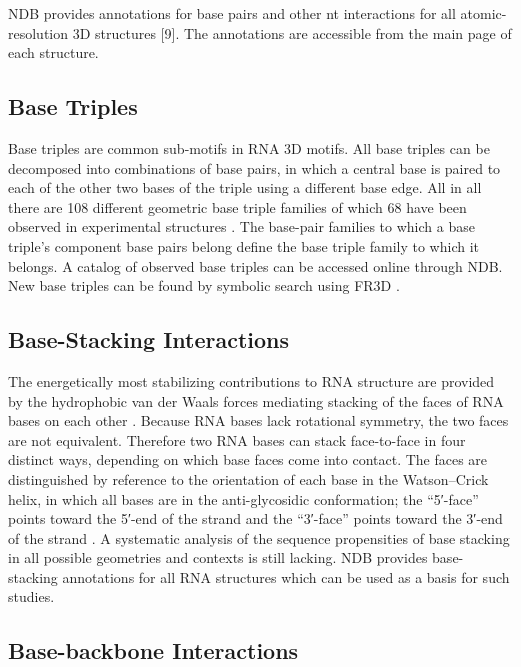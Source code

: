 NDB provides annotations for base pairs and other nt interactions for all
atomic-resolution 3D structures [9]. The annotations are accessible from the
main page of each structure. 

\subsection{Base Triples}

Base triples are common sub-motifs in RNA 3D motifs. All base triples can be
decomposed into combinations of base pairs, in which a central base is paired to
each of the other two bases of the triple using a different base edge. All in
all there are 108 different geometric base triple families of which 68 have been
observed in experimental structures \cite{AbuAlmakarem2012b}. The base-pair
families to which a base triple's component base pairs belong define the base
triple family to which it belongs. A catalog of observed base triples can be
accessed online through NDB. New base triples can be found by symbolic search
using FR3D \cite{Petrov2011a}. 

\subsection{Base-Stacking Interactions}

The energetically most stabilizing contributions to RNA structure are provided
by the hydrophobic van der Waals forces mediating stacking of the faces of RNA
bases on each other \cite{Sponer2010}. Because RNA bases lack rotational
symmetry, the two faces are not equivalent. Therefore two RNA bases can stack
face-to-face in four distinct ways, depending on which base faces come into
contact. The faces are distinguished by reference to the orientation of each
base in the Watson–Crick helix, in which all bases are in the anti-glycosidic
conformation; the ``5′-face'' points toward the 5′-end of the strand and the
``3′-face'' points toward the 3′-end of the strand \cite{Hoehndorf2011,
Sarver2008a}. A systematic analysis of the sequence propensities of base
stacking in all possible geometries and contexts is still lacking. NDB provides
base-stacking annotations for all RNA structures which can be used as a basis
for such studies. 

\subsection{Base-backbone Interactions }

